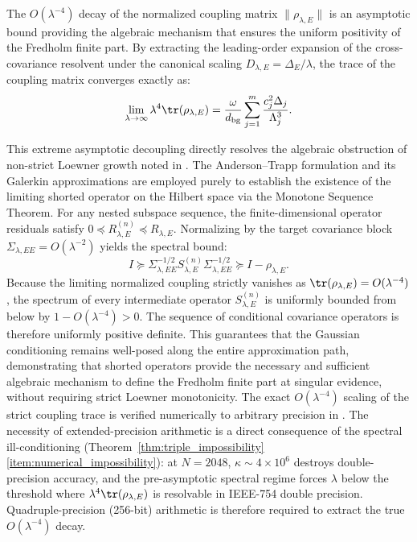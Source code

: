 \begin{remark}
  \label{rem:asymptotic_coupling_precision}
  The $O(\lambda^{-4})$ decay of the normalized coupling matrix $\|\rho_{\lambda,E}\|$ is an asymptotic bound providing the algebraic mechanism that ensures the uniform positivity of the Fredholm finite part. By extracting the leading-order expansion of the cross-covariance resolvent under the canonical scaling $D_{\lambda,E} = \Delta_E / \lambda$, the trace of the coupling matrix converges exactly as:
  \begin{equation}
    \lim_{\lambda\to\infty} \lambda^4 \tr(\rho_{\lambda,E}) = \frac{\omega}{d_{\mathrm{bg}}} \sum_{j=1}^m \frac{c_j^2 \Delta_j}{\Lambda_j^3}.
  \end{equation}
  
  This extreme asymptotic decoupling directly resolves the algebraic obstruction of non-strict Loewner growth noted in . The Anderson--Trapp formulation and its Galerkin approximations are employed purely to establish the existence of the limiting shorted operator on the Hilbert space via the Monotone Sequence Theorem. For any nested subspace sequence, the finite-dimensional operator residuals satisfy $0 \preceq R_{\lambda,E}^{(n)} \preceq R_{\lambda,E}$. Normalizing by the target covariance block $\Sigma_{\lambda,EE} = O(\lambda^{-2})$ yields the spectral bound:
  \[
    I \succeq \Sigma_{\lambda,EE}^{-1/2} S_{\lambda,E}^{(n)} \Sigma_{\lambda,EE}^{-1/2} \succeq I - \rho_{\lambda,E}.
  \]
  Because the limiting normalized coupling strictly vanishes as $\tr(\rho_{\lambda,E}) = O(\lambda^{-4})$, the spectrum of every intermediate operator $S_{\lambda,E}^{(n)}$ is uniformly bounded from below by $1 - O(\lambda^{-4}) > 0$. The sequence of conditional covariance operators is therefore uniformly positive definite. This guarantees that the Gaussian conditioning remains well-posed along the entire approximation path, demonstrating that shorted operators provide the necessary and sufficient algebraic mechanism to define the Fredholm finite part at singular evidence, without requiring strict Loewner monotonicity. The exact $O(\lambda^{-4})$ scaling of the strict coupling trace is verified numerically to arbitrary precision in .  The necessity of extended-precision arithmetic is a direct consequence of the spectral ill-conditioning (Theorem~\ref{thm:triple_impossibility}\ref{item:numerical_impossibility}): at $N=2048$, $\kappa\sim4\times10^{6}$ destroys double-precision accuracy, and the pre-asymptotic spectral regime forces $\lambda$ below the threshold where $\lambda^{4}\tr(\rho_{\lambda,E})$ is resolvable in IEEE-754 double precision.  Quadruple-precision (256-bit) arithmetic is therefore required to extract the true $O(\lambda^{-4})$ decay.
\end{remark}

